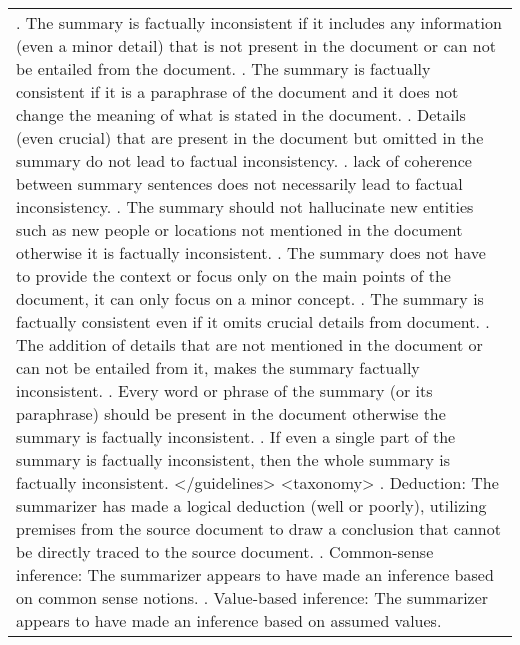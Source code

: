 \begin{table*}
\begin{tabular}{@{}p{14cm}@{}}
    \newline
    4. The summary is factually inconsistent if it includes any information (even a minor detail) that is not present in the document or can not be entailed from the document.
    \newline
    5. The summary is factually consistent if it is a paraphrase of the document and it does not change the meaning of what is stated in the document.
    \newline
    6. Details (even crucial) that are present in the document but omitted in the summary do not lead to factual inconsistency.
    \newline
    7. lack of coherence between summary sentences does not necessarily lead to factual inconsistency.
    \newline
    8. The summary should not hallucinate new entities such as new people or locations not mentioned in the document otherwise it is factually inconsistent.
    \newline
    9. The summary does not have to provide the context or focus only on the main points of the document, it can only focus on a minor concept.
    \newline
    10. The summary is factually consistent even if it omits crucial details from document.
    \newline
    11. The addition of details that are not mentioned in the document or can not be entailed from it, makes the summary factually inconsistent.
    \newline
    12. Every word or phrase of the summary (or its paraphrase) should be present in the document otherwise the summary is factually inconsistent.
    \newline
    13. If even a single part of the summary is factually inconsistent, then the whole summary is factually inconsistent.
    \newline
    </guidelines>
\newline
\newline
<taxonomy>
\newline
    1. Deduction: The summarizer has made a logical deduction (well or poorly), utilizing premises from the source document to draw a conclusion that cannot be directly traced to the source document.
    \newline
    2. Common-sense inference: The summarizer appears to have made an inference based on common sense notions.
    \newline
    3. Value-based inference: The summarizer appears to have made an inference based on assumed values.

\end{tabular}
\end{table*}
